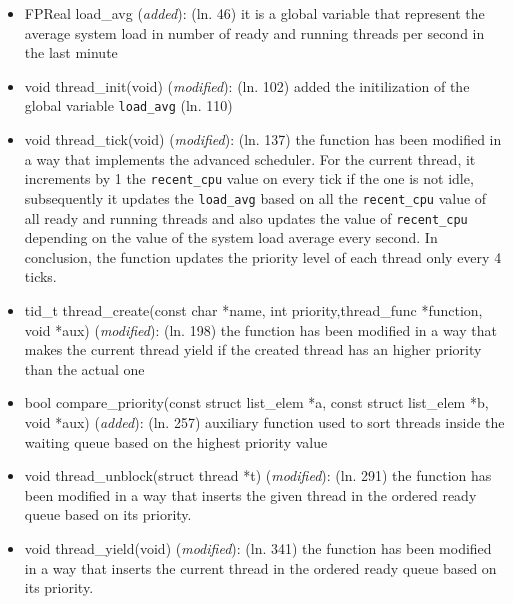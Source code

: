 \documentclass[11pt]{scrartcl}
\begin{document}
\begin{itemize} 
    \item FPReal load\_avg  (\textit{added}): \newline
    (ln. 46) it is a global variable that represent the average system load in number of ready and running threads per second in the last minute
	\item void thread\_init(void) (\textit{modified}): \newline
	(ln. 102) added the initilization of the global variable \texttt{load\_avg} (ln. 110)
	\item void thread\_tick(void) (\textit{modified}): \newline
	(ln. 137) the function has been modified in a way that implements the advanced scheduler. For the current thread, 
	it increments by 1 the \texttt{recent\_cpu} value on every tick if the one is not idle, subsequently it updates the \texttt{load\_avg} based on all the \texttt{recent\_cpu} value of all ready and running threads and also updates the value of \texttt{recent\_cpu} 
	depending on the value of the system load average every second. In conclusion, the function updates the priority level of each thread only every 4 ticks.   

	\item tid\_t thread\_create(const char *name, int priority,thread\_func *function, void *aux) (\textit{modified}): \newline %
	(ln. 198) the function has been modified in a way that makes the current thread yield if the created thread has an higher priority than the actual one 
	\item bool compare\_priority(const struct list\_elem *a, const struct list\_elem *b, void *aux) (\textit{added}): \newline 
	(ln. 257) auxiliary function used to sort threads inside the waiting queue based on the highest priority value
	
	\item void thread\_unblock(struct thread *t) (\textit{modified}): \newline 
	(ln. 291) the function has been modified in a way that inserts the given thread in the ordered ready queue based on its priority. 
	\item void thread\_yield(void) (\textit{modified}): \newline 
	(ln. 341) the function has been modified in a way that inserts the current thread in the ordered ready queue based on its priority. 
	

\end{itemize}
\end{document}
